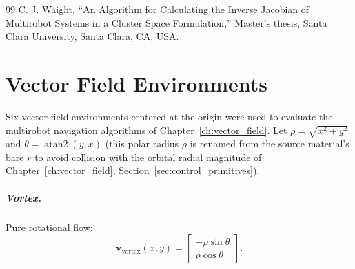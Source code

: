 \documentclass[12pt, letterpaper, oneside]{report}
\begin{document}
\begin{thebibliography}{99}
 C. J. Waight, ``An Algorithm for Calculating the Inverse Jacobian
of Multirobot Systems in a Cluster Space Formulation,'' Master's thesis,
Santa Clara University, Santa Clara, CA, USA.


\end{thebibliography}

\appendix

\chapter{Vector Field Environments}
\label{app:vector_fields}

Six vector field environments centered at the origin were used to evaluate
the multirobot navigation algorithms of Chapter~\ref{ch:vector_field}. Let
$\rho=\sqrt{x^2+y^2}$ and $\theta=\operatorname{atan2}(y,x)$ (this polar
radius $\rho$ is renamed from the source material's bare $r$ to avoid
collision with the orbital radial magnitude of
Chapter~\ref{ch:vector_field}, Section~\ref{sec:control_primitives}).

\paragraph{Vortex.} Pure rotational flow:
\begin{equation}
\mathbf{v}_{\text{vortex}}(x,y) = \begin{bmatrix} -\rho\sin\theta \\ \rho\cos\theta \end{bmatrix}.
\end{equation}
\end{document}
